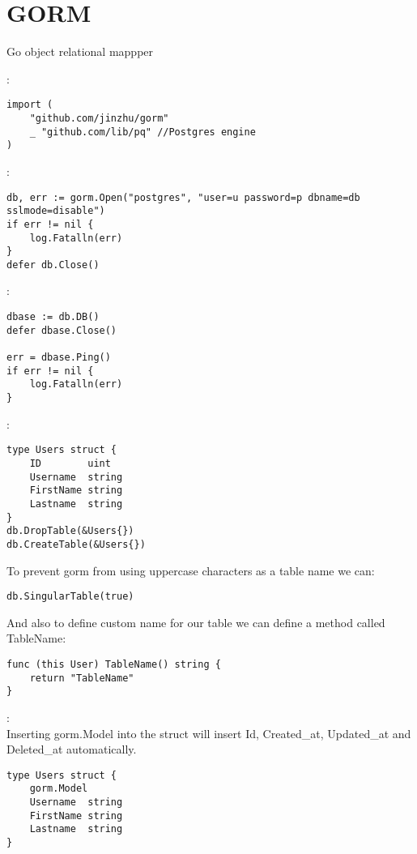 \section{GORM}
Go object relational mappper
\begin{note}:
\begin{lstlisting}[language=Golang]
import (
	"github.com/jinzhu/gorm"
	_ "github.com/lib/pq" //Postgres engine
)
\end{lstlisting}
\end{note}
\begin{note}:
\begin{lstlisting}[language=Golang]
db, err := gorm.Open("postgres", "user=u password=p dbname=db sslmode=disable")
if err != nil {
	log.Fatalln(err)
}
defer db.Close()
\end{lstlisting}
\end{note}
\begin{note}:
\begin{lstlisting}[language=Golang]
dbase := db.DB()
defer dbase.Close()

err = dbase.Ping()
if err != nil {
	log.Fatalln(err)
}
\end{lstlisting}
\end{note}
\begin{note}:
\begin{lstlisting}[language=Golang]
type Users struct {
	ID        uint
	Username  string
	FirstName string
	Lastname  string
}
db.DropTable(&Users{})
db.CreateTable(&Users{})
\end{lstlisting}
To prevent gorm from using uppercase characters as a table name we can:
\begin{lstlisting}[language=Golang]
db.SingularTable(true)
\end{lstlisting}
And also to define custom name for our table we can define a method called TableName:
\begin{lstlisting}[language=Golang]
func (this User) TableName() string {
	return "TableName"
}
\end{lstlisting}
\end{note}
\begin{note}:\\
Inserting gorm.Model into the struct will insert Id, Created\_at, Updated\_at and Deleted\_at automatically.
\begin{lstlisting}[language=Golang]
type Users struct {
	gorm.Model
	Username  string
	FirstName string
	Lastname  string
}
\end{lstlisting}	
\end{note}
